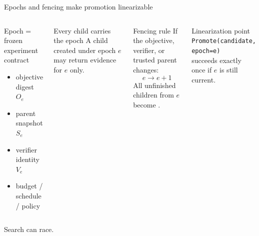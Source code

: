 \begin{frame}{Epochs and fencing make promotion linearizable}
\small
\begin{columns}[T,onlytextwidth]
\begin{block}{Epoch = frozen experiment contract}
\begin{itemize}
  \item objective digest $O_e$
  \item parent snapshot $S_e$
  \item verifier identity $V_e$
  \item budget / schedule / policy
\end{itemize}
\end{block}

\begin{block}{Every child carries the epoch}
A child created under epoch $e$ may return evidence for $e$ only.
\end{block}

\begin{block}{Fencing rule}
If the objective, verifier, or trusted parent changes:
\[
e \rightarrow e+1
\]
All unfinished children from $e$ become .
\end{block}

\begin{block}{Linearization point}
\centering
\texttt{Promote(candidate, epoch=e)}\\
succeeds exactly once if $e$ is still current.
\end{block}
\end{columns}

\vspace{0.35em}
\centering\large Search can race. 
\end{frame}

